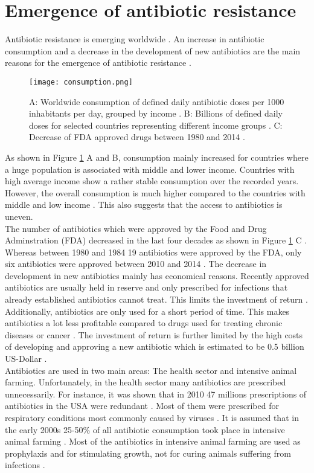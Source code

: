 \section{Emergence of antibiotic resistance}
Antibiotic resistance is emerging worldwide \cite{ventola_antibiotic_2015}. An increase in antibiotic consumption and a decrease in the development of new antibiotics are the main reasons for the emergence of antibiotic resistance \cite{ventola_antibiotic_2015}. 
\begin{figure}
	\texttt{[image: consumption.png]}
	\caption{A: Worldwide consumption of defined daily antibiotic doses per 1000 inhabitants per day, grouped by income \cite{klein_global_2018}.  B: Billions of defined daily doses for selected countries representing different income groups \cite{klein_global_2018}. C: Decrease of FDA approved drugs between 1980 and 2014 \cite{ventola_antibiotic_2015}.}
	\label{figure:emergence}
\end{figure}
As shown in Figure \ref{figure:emergence} A and B, consumption mainly increased for countries where a huge population is associated with middle and lower income. Countries with high average income show a rather stable consumption over the recorded years. However, the overall consumption is much higher compared to the countries with middle and low income \cite{klein_global_2018}. This also suggests that the access to antibiotics is uneven.\\
The number of antibiotics which were approved by the Food and Drug  Adminstration (FDA) decreased in the last four decades as shown in Figure \ref{figure:emergence} C \cite{ventola_antibiotic_2015}. Whereas between 1980 and 1984 19 antibiotics were approved by the FDA, only six antibiotics were approved between 2010 and 2014 \cite{ventola_antibiotic_2015}. The decrease in development in new antibiotics mainly has economical reasons. Recently approved antibiotics are usually held in reserve and only prescribed for infections that already established antibiotics cannot treat. This limits the investment of return \cite{fair_antibiotics_2014}. Additionally, antibiotics are only used for a short period of time. This makes antibiotics a lot less profitable compared to drugs used for treating chronic diseases or cancer \cite{fair_antibiotics_2014}. The investment of return is further limited by the high costs of developing and approving a new antibiotic which is estimated to be 0.5 billion US-Dollar \cite{costs}. \\
Antibiotics are used in two main areas: The health sector and intensive animal farming. Unfortunately, in the health sector many antibiotics are prescribed unnecessarily. For instance, it was shown that in 2010 47 millions prescriptions of antibiotics in the USA were redundant \cite{noauthor_antibiotic_2019}. Most of them were prescribed for respiratory conditions most commonly caused by viruses \cite{noauthor_antibiotic_2019}. It is assumed that in the early 2000s 25-50\% of all antibiotic consumption took place in intensive animal farming  \cite{palumbi_humans_2001}. Most of the antibiotics in intensive animal farming are used as prophylaxis and for stimulating growth, not for curing animals suffering from infections \cite{palumbi_humans_2001}\cite{zhu_diverse_2013}. \\
